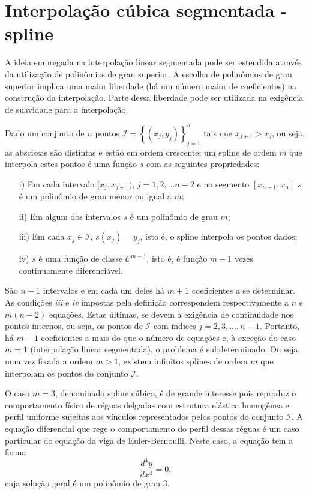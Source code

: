 \section{Interpolação cúbica segmentada - spline}
A ideia empregada na interpolação linear segmentada pode ser estendida através da utilização de polinômios de grau superior. A escolha de polinômios de grau superior implica uma maior liberdade (há um número maior de coeficientes) na construção da interpolação. Parte dessa liberdade pode ser utilizada na exigência de suavidade para a interpolação.

\begin{defn}Dado um conjunto de $n$ pontos $\mathcal{I}=\left\{(x_j,y_j)\right\}_{j=1}^n$ tais que $x_{j+1}>x_j$, ou seja, as abscissas são distintas e estão em ordem crescente; um spline de ordem $m$ que interpola estes pontos é uma função $s$ com as seguintes propriedades:
\begin{itemize}
\item[i)] Em cada intervalo $[x_j,x_{j+1})$, $j=1,2,\ldots n-2$ e no segmento $[x_{n-1},x_n]$ $s$ é um polinômio de grau menor ou igual a  $m$;
\item[ii)] Em algum dos intervalos $s$ é um polinômio de grau $m$;
\item[iii)] Em cada $x_j\in \mathcal{I}$, $s(x_j)=y_j$, isto é, o spline interpola os pontos dados;
\item[iv)] $s$ é uma função de classe $\mathcal{C}^{m-1}$, isto é, é função $m-1$ vezes continuamente diferenciável.
\end{itemize}
\end{defn}

São $n-1$ intervalos e em cada um deles há $m+1$ coeficientes a se determinar. As condições \textit{iii} e \textit{iv} impostas pela definição correspondem respectivamente a $n$ e $m(n-2)$ equações. Estas últimas, se devem à exigência de continuidade nos pontos internos, ou seja, os pontos de $\mathcal{I}$ com índices $j=2,3,\ldots,n-1$. Portanto, há $m-1$ coeficientes a mais do que o número de equações e, à exceção do caso $m=1$ (interpolação linear segmentada), o problema é subdeterminado. Ou seja, uma vez fixada a ordem $m>1$, existem infinitos splines de ordem $m$ que interpolam os pontos do conjunto $\mathcal{I}$.

O caso $m=3$, denominado spline cúbico, é de grande interesse pois reproduz o comportamento físico de réguas delgadas com estrutura elástica homogênea e perfil uniforme sujeitas aos vínculos representados pelos pontos  do conjunto $\mathcal{I}$. A equação diferencial que rege o comportamento do perfil dessas réguas é um caso particular do equação da viga de Euler-Bernoulli. Neste caso, a equação tem a forma 
\begin{equation}\label{eq:ed-splin3}
\dfrac{d^4y}{dx^4}=0,
\end{equation}
cuja solução geral é um polinômio de grau 3. 


